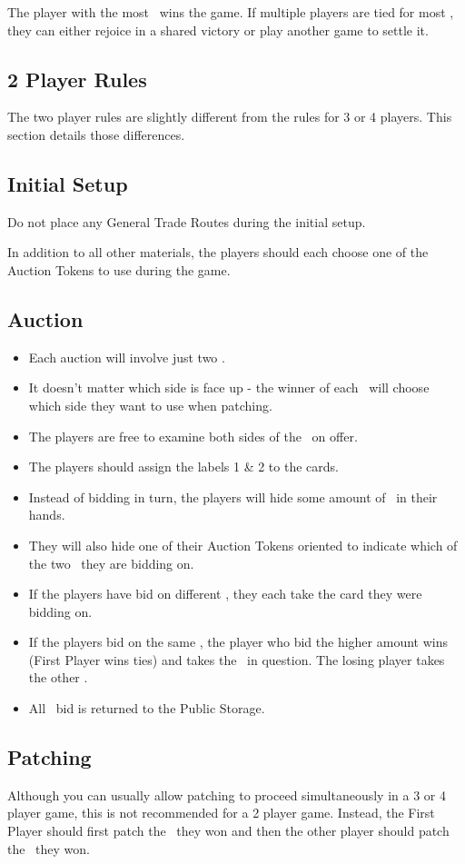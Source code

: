 \documentclass[10pt,twocolumn]{article}
\begin{document}
The player with the most \vps\ wins the game. If multiple players are tied for most \vp, they can either rejoice in a shared victory or play another game to settle it.
\begin{appendices}
\section{2 Player Rules}
The two player rules are slightly different from the rules for 3 or 4 players. This section details those differences.
\subsection{Initial Setup}
Do not place any General Trade Routes during the initial setup.

In addition to all other materials, the players should each choose one of the Auction Tokens to use during the game.
\subsection{Auction}
\begin{itemize}
\item Each auction will involve just two \landcards.
\item It doesn't matter which side is face up - the winner of each \landcard\ will choose which side they want to use when patching.
\item The players are free to examine both sides of the \landcards\ on offer.
\item The players should assign the labels 1 \& 2 to the cards.
\item Instead of bidding in turn, the players will hide some amount of \money\ in their hands.
\item They will also hide one of their Auction Tokens oriented to indicate which of the two \landcards\ they are bidding on.
\item If the players have bid on different \landcards, they each take the card they were bidding on.
\item If the players bid on the same \landcard, the player who bid the higher amount wins (First Player wins ties) and takes the \landcard\ in question. The losing player takes the other \landcard.
\item All \money\ bid is returned to the Public Storage.
\end{itemize}
\subsection{Patching}
Although you can usually allow patching to proceed simultaneously in a 3 or 4 player game, this is not recommended for a 2 player game. Instead, the First Player should first patch the \landcard\ they won and then the other player should patch the \landcard\ they won.

\end{appendices}
\end{document}
